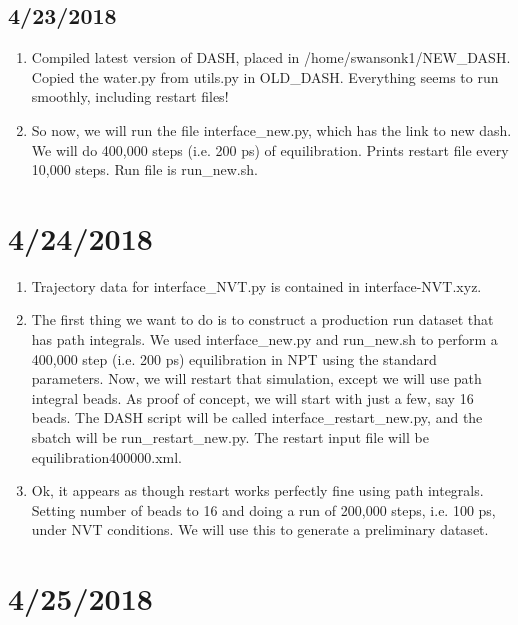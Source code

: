 \documentclass[12pt,reqno]{amsart}
\numberwithin{equation}{section}
\begin{document}
\subsection{4/23/2018}

\begin{enumerate}
\item Compiled latest version of DASH, placed in /home/swansonk1/NEW\_DASH.  Copied the water.py from utils.py in OLD\_DASH.  Everything seems to run smoothly, including restart files!  
\item So now, we will run the file interface\_new.py, which has the link to new dash.  We will do 400,000 steps (i.e. 200 ps) of equilibration.  Prints restart file every 10,000 steps.  Run file is run\_new.sh.    
\end{enumerate}

\section{4/24/2018}

\begin{enumerate}
\item Trajectory data for interface\_NVT.py is contained in interface-NVT.xyz.  
\item The first thing we want to do is to construct a production run dataset that has path integrals.  We used interface\_new.py and run\_new.sh to perform a 400,000 step (i.e. 200 ps) equilibration in NPT using the standard parameters.  Now, we will restart that simulation, except we will use path integral beads.  As proof of concept, we will start with just a few, say 16 beads.  The DASH script will be called interface\_restart\_new.py, and the sbatch will be run\_restart\_new.py.  The restart input file will be equilibration400000.xml.  
\item Ok, it appears as though restart works perfectly fine using path integrals.  Setting number of beads to 16 and doing a run of 200,000 steps, i.e. 100 ps, under NVT conditions.  We will use this to generate a preliminary dataset.  
\end{enumerate}

\section{4/25/2018}
\end{document}

